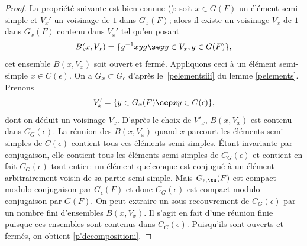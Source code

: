 \begin{proof}
La propriété suivante est bien connue (\cf \cite[Cor.\,2.4]{HC}): soit \hbox{$x\in G(F)$} un élément semi-simple et $V_{x}'$ un voisinage de $1$ dans $G_{x}(F)$; alors il existe un voisinage $V_{x}$ de $1$ dans $G_{x}(F)$ contenu dans $V_{x}'$ tel qu'en posant
\[
B(x,V_{x})=\{ g^{-1} xyg\sep y\in V_{x}, g\in G(F)\},
\]
cet ensemble $B(x,V_{x})$ soit ouvert et fermé. Appliquons ceci à un élément semi-simple $x \in C(\epsilon)$. On a $G_{x}\subset G_{\epsilon}$ d'après le~\eqref{pelementsiii} du lemme \ref{pelements}. Prenons
\[
V'_{x}=\{y\in G_{x}(F)\sep xy\in C(\epsilon)\},
\]
dont on déduit un voisinage $V_{x}$. D'après le choix de $V'_{x}$, $B(x,V_{x})$ est contenu dans $C_{G}(\epsilon)$. La réunion des $B(x,V_{x})$ quand $x$ parcourt les éléments semi-simples de $C(\epsilon)$ contient tous ces éléments semi-simples. Étant invariante par conjugaison, elle contient tous les éléments semi-simples de $C_{G}(\epsilon)$ et contient en fait $C_{G}(\epsilon)$ tout entier: un élément quelconque est conjugué à un élément arbitrairement voisin de sa partie semi-simple. Mais $G_{\epsilon,\tu}(F)$ est compact modulo conjugaison par $G_{\epsilon}(F)$ et donc $C_{G}(\epsilon)$ est compact modulo conjugaison par $G(F)$. On peut extraire un sous-recouvrement de $C_{G}(\epsilon)$ par un nombre fini d'ensembles $B(x,V_{x})$. Il s'agit en fait d'une réunion finie puisque ces ensembles sont contenus dans $C_{G}(\epsilon)$. Puisqu'ils sont ouverts et fermés, on obtient \eqref{p'decompositioni}.


\end{proof}
